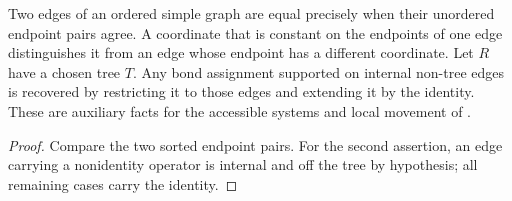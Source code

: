 \begin{lemma}
    \label{thm:peps_cycle_assignment_support}
    \leanok
    Two edges of an ordered simple graph are equal precisely when their
    unordered endpoint pairs agree. A coordinate that is constant on
    the endpoints of one edge distinguishes it from an edge whose
    endpoint has a different coordinate. Let $R$ have a chosen tree $T$. Any bond assignment supported on
    internal non-tree edges is recovered by restricting it to those edges and
    extending it by the identity. These are auxiliary facts for the accessible
    systems and local movement of \cite[Theorem~6.16]{Schuch2010PEPS}.
\end{lemma}

\begin{proof}\leanok
    Compare the two sorted endpoint pairs. For the second assertion, an edge
    carrying a nonidentity operator is internal and off the tree by hypothesis;
    all remaining cases carry the identity.
\end{proof}
